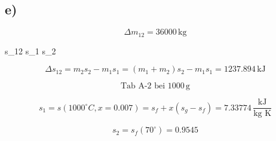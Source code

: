 

\subsection*{e)}
\[
\Delta m_{12} = 36000 \, \text{kg}
\]

 s_{12} s_{1} s_{2}

\[
\Delta s_{12} = m_2 s_2 - m_1 s_1 = (m_1 + m_2) s_2 - m_1 s_1 = 1237.894 \, \text{kJ}
\]

\[
\text{Tab A-2 bei } 1000 \, \text{g}
\]

\[
s_1 = s(1000^\circ C, x = 0.007) = s_f + x(s_g - s_f) = 7.33774 \, \frac{\text{kJ}}{\text{kg K}}
\]

\[
s_2 = s_f(70^\circ) = 0.9545
\]